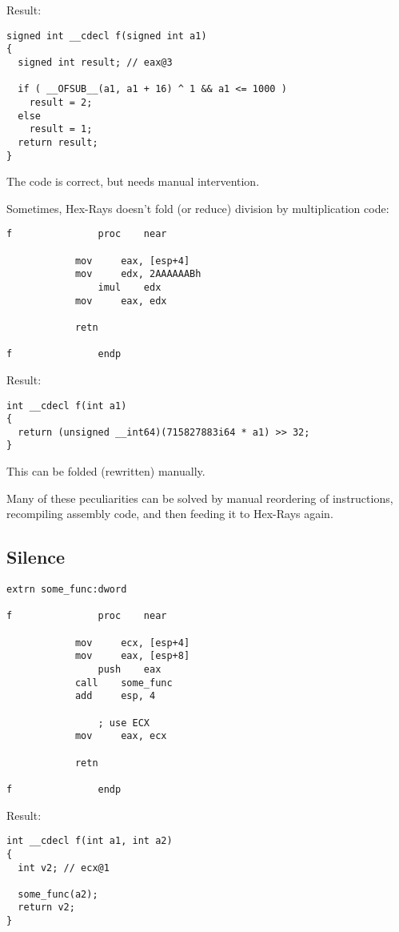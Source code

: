 Result:

\begin{lstlisting}
signed int __cdecl f(signed int a1)
{
  signed int result; // eax@3

  if ( __OFSUB__(a1, a1 + 16) ^ 1 && a1 <= 1000 )
    result = 2;
  else
    result = 1;
  return result;
}
\end{lstlisting}

The code is correct, but needs manual intervention.

Sometimes, Hex-Rays doesn't fold (or reduce) division by multiplication code:

\begin{lstlisting}
f               proc    near

        	mov     eax, [esp+4]
	        mov     edx, 2AAAAAABh
                imul    edx
        	mov     eax, edx

	        retn

f               endp
\end{lstlisting}

Result:

\begin{lstlisting}
int __cdecl f(int a1)
{
  return (unsigned __int64)(715827883i64 * a1) >> 32;
}
\end{lstlisting}

This can be folded (rewritten) manually.

Many of these peculiarities can be solved by manual reordering of instructions, recompiling assembly code,
and then feeding it to Hex-Rays again.

\subsection{Silence}

\begin{lstlisting}
extrn some_func:dword

f               proc    near

        	mov     ecx, [esp+4]
	        mov     eax, [esp+8]
                push    eax
        	call    some_func
	        add     esp, 4

                ; use ECX
        	mov     eax, ecx

	        retn

f               endp
\end{lstlisting}

Result:

\begin{lstlisting}
int __cdecl f(int a1, int a2)
{
  int v2; // ecx@1

  some_func(a2);
  return v2;
}
\end{lstlisting}

